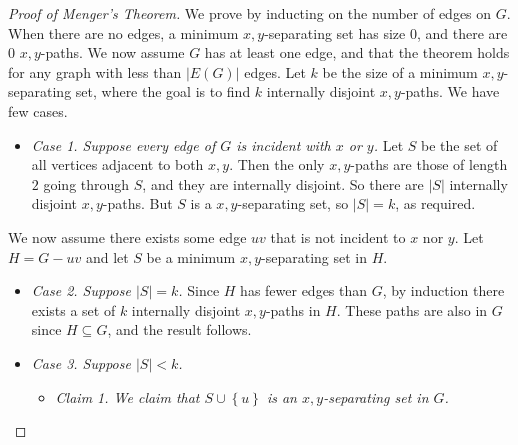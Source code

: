 \documentclass[co342]{subfiles}
\begin{document}
    \begin{proof}[Proof of Menger's Theorem]
        We prove by inducting on the number of edges on $G$. When there are no edges, a minimum $x,y$-separating set has size $0$, and there are $0$ $x,y$-paths. We now assume $G$ has at least one edge, and that the theorem holds for any graph with less than $\left| E\left( G \right) \right|$ edges. Let $k$ be the size of a minimum $x,y$-separating set, where the goal is to find $k$ internally disjoint $x,y$-paths. We have few cases.
        \begin{itemize}
            \item \textit{Case 1. Suppose every edge of $G$ is incident with $x$ or $y$.} Let $S$ be the set of all vertices adjacent to both $x,y$. Then the only $x,y$-paths are those of length $2$ going through $S$, and they are internally disjoint. So there are $\left| S \right|$ internally disjoint $x,y$-paths. But $S$ is a $x,y$-separating set, so $\left| S \right|=k$, as required.
        \end{itemize} 
        We now assume there exists some edge $uv$ that is not incident to $x$ nor $y$. Let $H = G-uv$ and let $S$ be a minimum $x,y$-separating set in $H$.
        \begin{itemize}
            \item \textit{Case 2. Suppose $\left| S \right| = k$.} Since $H$ has fewer edges than $G$, by induction there exists a set of $k$ internally disjoint $x,y$-paths in $H$. These paths are also in $G$ since $H\subseteq G$, and the result follows.
            \item \textit{Case 3. Suppose $\left| S \right|< k$.} 
                \begin{itemize}
                    \item \textit{Claim 1. We claim that $S\cup \left\lbrace u \right\rbrace$ is an $x,y$-separating set in $G$.}


\end{itemize}
\end{itemize}
\end{proof}
\end{document}
